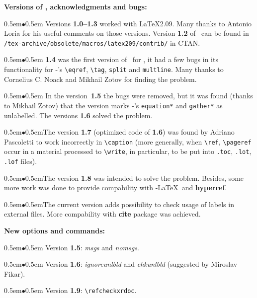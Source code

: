 \documentclass[11pt]{article}
\begin{document}
\bigskip

\def\item{\noindent\mbox{\kern0.5em$\bullet$\kern0.5em}}

\textbf{Versions of \RefCheck, acknowledgments and bugs:}

\item
Versions \textbf{1.0--1.3} worked with \LaTeX2.09.  Many
thanks to Antonio Loria for his useful comments on those versions.
Version \textbf{1.2} of \RefCheck\ can be found in
\texttt{/tex-archive/obsolete/macros/latex209/contrib/} in CTAN.

\item
\textbf{1.4} was the first version of \RefCheck\ for \LaTeXe, it had a
few bugs in its functionality for \AmS-\LaTeXe's \verb#\eqref#,
\verb#\tag#, \verb#split# and \verb#multline#.  Many thanks to
Cornelius C. Noack and Mikhail Zotov for finding the problem.

\item
In the version~\textbf{1.5} the bugs were removed, but it was found
(thanks to Mikhail Zotov) that the version marks \AmS-\LaTeXe's
\verb#equation*# and \verb#gather*# as unlabelled.  The versions
\textbf{1.6} solved the problem.

\item The version \textbf{1.7} (optimized code of \textbf{1.6}) was
found by Adriano Pascoletti to work incorrectly in \verb#\caption# (more
generally, when \verb#\ref#, \verb#\pageref# occur in a material
processed to \verb#\write#, in particular, to be put into \texttt{.toc},
\texttt{.lot}, \texttt{.lof} files).

\item The version \textbf{1.8} was intended to solve the
problem. Besides, some more work was done to provide compability with
\AmS-\LaTeX\ and \textbf{hyperref}.

\item The current version \textbf{\curversion} adds possibility to check
usage of labels in external files. More compability with \textbf{cite} package
was achieved.

\medskip

\textbf{New options and commands:}

\item
Version \textbf{1.5}: \textit{msgs\/} and \textit{nomsgs\/}.

\item
Version \textbf{1.6}: \textit{ignoreunlbld\/} and
\textit{chkunlbld\/} (suggested by Miroslav Fikar).

\item
Version \textbf{1.9}: \verb#\refcheckxrdoc#.
\end{document}
